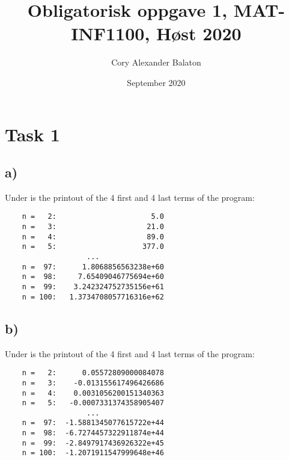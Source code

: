 \documentclass{article}
\title{Obligatorisk oppgave 1, MAT-INF1100, Høst 2020}
\author{Cory Alexander Balaton}
\date{September 2020}
\begin{document}
\maketitle
\newpage

\section*{Task 1}

\subsection*{a)}

Under is the printout of the 4 first and 4 last terms of the program:
\begin{verbatim}
    n =   2:                      5.0
    n =   3:                     21.0
    n =   4:                     89.0
    n =   5:                    377.0
                   ...              
    n =  97:      1.8068856563238e+60
    n =  98:     7.65409046775694e+60
    n =  99:    3.242324752735156e+61
    n = 100:   1.3734708057716316e+62
\end{verbatim}

\newpage

\subsection*{b)}

Under is the printout of the 4 first and 4 last terms of the program:
\begin{verbatim}
    n =   2:      0.05572809000084078
    n =   3:    -0.013155617496426686
    n =   4:    0.0031056200151340363
    n =   5:   -0.0007331374358905407
                   ...              
    n =  97:  -1.5881345077615722e+44
    n =  98:  -6.7274457322911874e+44
    n =  99:  -2.8497917436926322e+45
    n = 100:  -1.2071911547999648e+46
\end{verbatim}

\newpage
\end{document}
